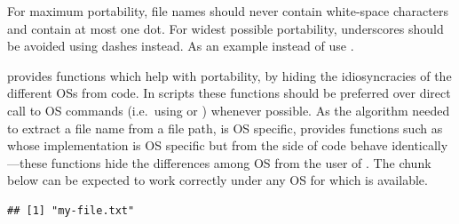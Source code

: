 \documentclass[krantz2]{krantz}\usepackage{knitr}%
\begin{document}
\begin{warningbox}
For maximum portability, file names should never contain white-space characters and contain at most one dot. For widest possible portability, underscores should be avoided using dashes instead. As an example instead of  use .
\end{warningbox}

\Rlang provides functions which help with portability, by hiding the idiosyncracies of the different OSs from \Rlang code. In scripts these functions should be preferred over direct call to OS commands (i.e.\ using  or ) whenever possible. As the algorithm needed to extract a file name from a file path, is OS specific, \Rlang provides functions such as  whose implementation is OS specific but from the side of \Rlang code behave identically---these functions hide the differences among OS from the user of \Rlang. The chunk below can be expected to work correctly under any OS for which \Rlang is available.

\begin{knitrout}\footnotesize
{}\color{fgcolor}\begin{kframe}
\begin{alltt}
\hlstd{(}\hlstd{)}
\end{alltt}
\begin{verbatim}
## [1] "my-file.txt"
\end{verbatim}
\end{kframe}
\end{knitrout}
\end{document}
